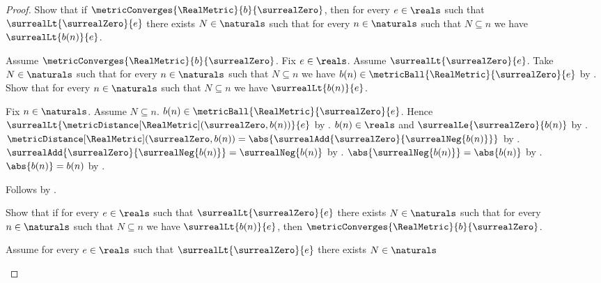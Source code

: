 \begin{proof}
    Show that if $\metricConverges{\RealMetric}{b}{\surrealZero}$, then
        for every $e\in\reals$ such that
            $\surrealLt{\surrealZero}{e}$ there exists $N\in\naturals$
            such that for every $n\in\naturals$ such that $N\subseteq n$
                we have $\surrealLt{b(n)}{e}$.
    \begin{subproof}
        Assume $\metricConverges{\RealMetric}{b}{\surrealZero}$.
        Fix $e\in\reals$.
        Assume $\surrealLt{\surrealZero}{e}$.
        Take $N\in\naturals$ such that for every $n\in\naturals$
            such that $N\subseteq n$ we have
                $b(n)\in\metricBall{\RealMetric}{\surrealZero}{e}$
            by .
        Show that for every $n\in\naturals$ such that $N\subseteq n$
            we have $\surrealLt{b(n)}{e}$.
        \begin{subproof}
            Fix $n\in\naturals$.
            Assume $N\subseteq n$.
            $b(n)\in\metricBall{\RealMetric}{\surrealZero}{e}$.
            Hence
                $\surrealLt{
                    \metricDistance[\RealMetric](\surrealZero,b(n))}{e}$
                by .
            $b(n)\in\reals$ and $\surrealLe{\surrealZero}{b(n)}$
                by .
            $\metricDistance[\RealMetric](\surrealZero,b(n))
                =\abs{\surrealAdd{\surrealZero}{\surrealNeg{b(n)}}}$
                by .
            $\surrealAdd{\surrealZero}{\surrealNeg{b(n)}}
                =\surrealNeg{b(n)}$
                by
                .
            $\abs{\surrealNeg{b(n)}}=\abs{b(n)}$
                by .
            $\abs{b(n)}=b(n)$
                by .
        \end{subproof}
        Follows by \auto.
    \end{subproof}
    Show that if for every $e\in\reals$ such that
        $\surrealLt{\surrealZero}{e}$ there exists $N\in\naturals$
        such that for every $n\in\naturals$ such that $N\subseteq n$
            we have $\surrealLt{b(n)}{e}$, then
        $\metricConverges{\RealMetric}{b}{\surrealZero}$.
    \begin{subproof}
        Assume for every $e\in\reals$ such that
            $\surrealLt{\surrealZero}{e}$ there exists $N\in\naturals$

\end{subproof}
\end{proof}

